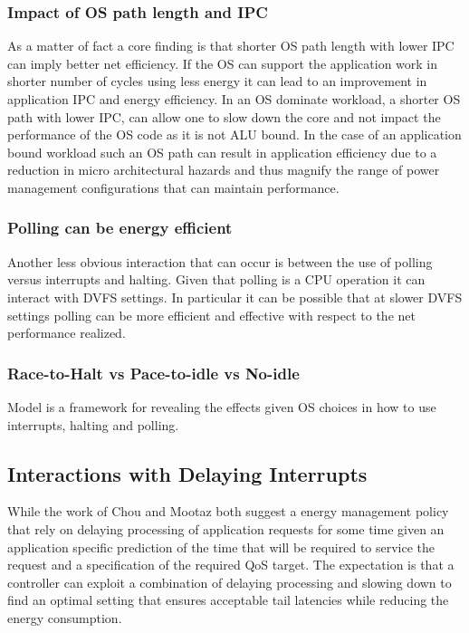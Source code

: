 \subsubsection{Impact of OS path length and IPC}
As a matter of fact a core finding is that  shorter OS path length with lower IPC can imply better net efficiency.  If the OS can support the application work in shorter number of cycles using less energy it can lead to an improvement in application IPC and energy efficiency.  In an OS dominate workload, a shorter OS path with lower IPC, can allow one to slow down the core and not impact the performance of the OS code as it is not ALU bound. In the case of an application bound workload such an OS path can result in application efficiency due to a reduction in micro architectural hazards and thus magnify the range of power management configurations that can maintain performance.    
 

\subsubsection{Polling can be energy efficient}
Another less obvious interaction that can occur is between the use of polling versus interrupts and halting.  Given that polling is a CPU operation it can interact with DVFS settings.  In particular it can be possible that at slower DVFS settings polling can be more efficient and effective with respect to the net performance realized.  

\subsubsection{Race-to-Halt vs Pace-to-idle vs No-idle}

Model is a framework for revealing the effects given OS choices in how to use interrupts, halting and polling.  

\subsection{Interactions with Delaying Interrupts}

While the work of Chou and Mootaz both suggest a energy management policy that rely on delaying processing of application requests for some time given an application specific prediction of the time that will be required to service the request and a specification of the required QoS target.  The expectation is that a controller can exploit a combination of delaying processing and slowing down to find an optimal setting that ensures acceptable tail latencies while reducing the energy consumption.

